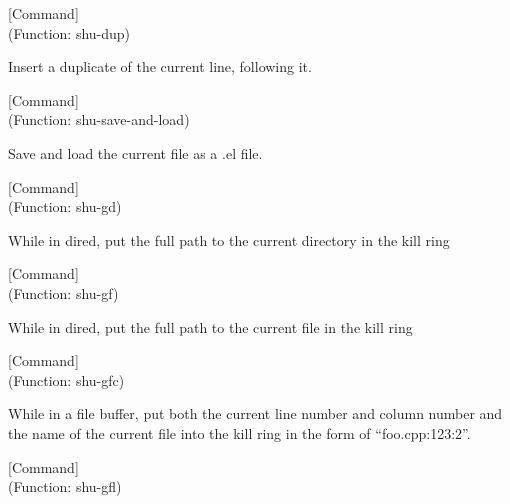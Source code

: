 \vspace{1em}
\noindent
{}
\usebox{\funcname}
 \hfill [Command]\\%
 (Function: shu-dup)

\begin{doc-string}
Insert a duplicate of the current line, following it.
\end{doc-string}

\vspace{1em}
\noindent
{}
\usebox{\funcname}
 \hfill [Command]\\%
 (Function: shu-save-and-load)

\begin{doc-string}
Save and load the current file as a .el file.
\end{doc-string}

\vspace{1em}
\noindent
{}
\usebox{\funcname}
 \hfill [Command]\\%
 (Function: shu-gd)

\begin{doc-string}
While in dired, put the full path to the current directory in the kill ring
\end{doc-string}

\vspace{1em}
\noindent
{}
\usebox{\funcname}
 \hfill [Command]\\%
 (Function: shu-gf)

\begin{doc-string}
While in dired, put the full path to the current file in the kill ring
\end{doc-string}

\vspace{1em}
\noindent
{}
\usebox{\funcname}
 \hfill [Command]\\%
 (Function: shu-gfc)

\begin{doc-string}
While in a file buffer, put both the current line number and
column number and the name of the current file into the kill ring
in the form of ``foo.cpp:123:2''.
\end{doc-string}

\vspace{1em}
\noindent
{}
\usebox{\funcname}
 \hfill [Command]\\%
 (Function: shu-gfl)

